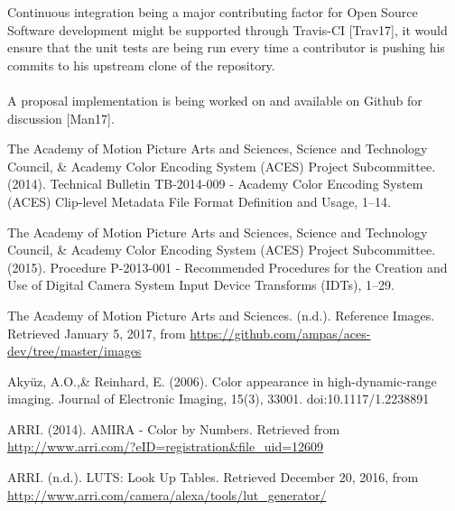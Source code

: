 \documentclass[conference]{IEEEtran}
\begin{document}
Continuous integration being a major contributing factor for Open Source Software development might be supported through Travis-CI [Trav17], it would ensure that the unit tests are being run every time a contributor is pushing his commits to his upstream clone of the repository.
\\ \\
A proposal implementation is being worked on and available on Github for discussion [Man17].

\vspace{10mm}

\begin{thebibliography}{1}
	\makeatletter
	\renewcommand\
	\makeatother
	

\renewcommand\@biblabel[1]{[Amp14]}
\bibitem{}
\vspace*{\fill}
The Academy of Motion Picture Arts and Sciences, Science and Technology Council, \& Academy Color Encoding System (ACES) Project Subcommittee. (2014). Technical Bulletin TB-2014-009 - Academy Color Encoding System (ACES) Clip-level Metadata File Format Definition and Usage, 1–14. \vspace{2mm}

\renewcommand\@biblabel[1]{[Amp15]}
\bibitem{}
The Academy of Motion Picture Arts and Sciences, Science and Technology Council, \& Academy Color Encoding System (ACES) Project Subcommittee. (2015). Procedure P-2013-001 - Recommended Procedures for the Creation and Use of Digital Camera System Input Device Transforms (IDTs), 1–29. \vspace{2mm}

\renewcommand\@biblabel[1]{[Amp17]}
\bibitem{}
The Academy of Motion Picture Arts and Sciences. (n.d.). Reference Images. Retrieved January 5, 2017, from \url{https://github.com/ampas/aces-dev/tree/master/images} \vspace{2mm}

\renewcommand\@biblabel[1]{[AR06]}
\bibitem{}
Akyüz, A.O.,\& Reinhard, E. (2006). Color appearance in high-dynamic-range imaging. Journal of Electronic Imaging, 15(3), 33001. doi:10.1117/1.2238891 \vspace{2mm}

\renewcommand\@biblabel[1]{[Arr14]}
\bibitem{}
ARRI. (2014). AMIRA - Color by Numbers. Retrieved from \url{http://www.arri.com/?eID=registration&file_uid=12609} \vspace{2mm}

\renewcommand\@biblabel[1]{[Arr16]}
\bibitem{}
ARRI. (n.d.). LUTS: Look Up Tables. Retrieved December 20, 2016, from \url{http://www.arri.com/camera/alexa/tools/lut_generator/} \vspace{2mm}


\end{thebibliography}
\end{document}
